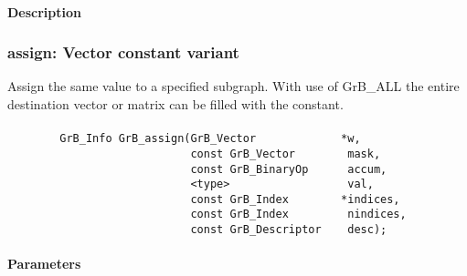 \paragraph{Description}

\subsubsection{{\sf assign}: Vector constant variant}

Assign the same value to a specified subgraph.  With use of {\sf GrB\_ALL} the entire
destination vector or matrix can be filled with the constant.


\paragraph{\syntax}

\begin{verbatim}
        GrB_Info GrB_assign(GrB_Vector             *w,
                            const GrB_Vector        mask,
                            const GrB_BinaryOp      accum,
                            <type>                  val,
                            const GrB_Index        *indices,
                            const GrB_Index         nindices,
                            const GrB_Descriptor    desc);
\end{verbatim}

\paragraph{Parameters}

